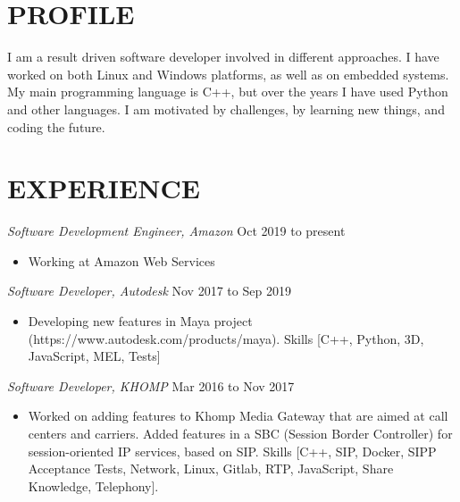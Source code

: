 \documentclass[line,margin]{res}
\begin{document}
\address{alvarofleith@gmail.com or +55 (48) 98458-9879}
\address{https://linkedin.com/in/alvarofleith}


\begin{resume}

\section{PROFILE}       I am a result driven software developer involved in different approaches. I have worked on both Linux and Windows platforms, as well as on embedded systems. My main programming language is C++, but over the years I have used Python and other languages. I am motivated by challenges, by learning new things, and coding the future.


 \section{EXPERIENCE} {\sl Software Development Engineer, Amazon} \hfill Oct 2019 to present \\
                 \begin{itemize}  \itemsep -2pt
                 \item Working at Amazon Web Services
                \end{itemize}
                
                {\sl Software Developer, Autodesk} \hfill Nov 2017 to Sep 2019 \\
                 \begin{itemize}  \itemsep -2pt
                 \item Developing new features in Maya project (https://www.autodesk.com/products/maya). Skills [C++, Python, 3D, JavaScript, MEL, Tests]
                \end{itemize}
 
                {\sl Software Developer, KHOMP} \hfill Mar 2016 to Nov 2017 \\
                 \begin{itemize}  \itemsep -2pt
                 \item Worked on adding features to Khomp Media Gateway that are aimed at call centers and carriers. Added features in a SBC (Session Border Controller) for session-oriented IP services, based on SIP. Skills [C++, SIP, Docker, SIPP Acceptance Tests, Network, Linux, Gitlab, RTP, JavaScript, Share Knowledge, Telephony].
                \end{itemize}


\end{resume}
\end{document}
